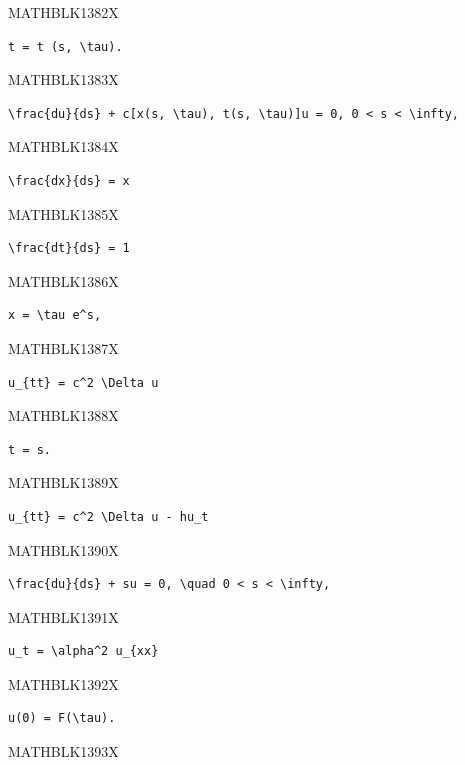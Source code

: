 \documentclass[
  ukrainian,
]{article}
\begin{document}
MATHBLK1382X

\begin{verbatim}
t = t (s, \tau).
\end{verbatim}

MATHBLK1383X

\begin{verbatim}
\frac{du}{ds} + c[x(s, \tau), t(s, \tau)]u = 0, 0 < s < \infty,
\end{verbatim}

MATHBLK1384X

\begin{verbatim}
\frac{dx}{ds} = x
\end{verbatim}

MATHBLK1385X

\begin{verbatim}
\frac{dt}{ds} = 1
\end{verbatim}

MATHBLK1386X

\begin{verbatim}
x = \tau e^s,
\end{verbatim}

MATHBLK1387X

\begin{verbatim}
u_{tt} = c^2 \Delta u
\end{verbatim}

MATHBLK1388X

\begin{verbatim}
t = s.
\end{verbatim}

MATHBLK1389X

\begin{verbatim}
u_{tt} = c^2 \Delta u - hu_t
\end{verbatim}

MATHBLK1390X

\begin{verbatim}
\frac{du}{ds} + su = 0, \quad 0 < s < \infty,
\end{verbatim}

MATHBLK1391X

\begin{verbatim}
u_t = \alpha^2 u_{xx}
\end{verbatim}

MATHBLK1392X

\begin{verbatim}
u(0) = F(\tau).
\end{verbatim}

MATHBLK1393X
\end{document}
